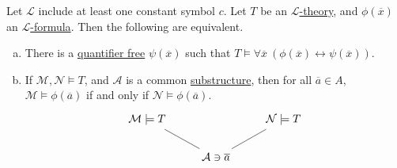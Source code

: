 \begin{theorem}\label{thm:QE-test}
	Let \(\mathcal{L} \) include at least one constant symbol \(c\). Let \(T\) be an \hyperref[def:theory]{\(\mathcal{L} \)-theory}, and \(\phi (\overline{x} )\) an \hyperref[def:formula]{\(\mathcal{L} \)-formula}. Then the following are equivalent.
	\begin{enumerate}[(a)]
		\item\label{thm:QE-test-a} There is a \hyperref[not:quantifier-free]{quantifier free} \(\psi (\overline{x} )\) such that \(T \models \forall \overline{x} \ (\phi (\overline{x} ) \leftrightarrow \psi (\overline{x} ))\).
		\item\label{thm:QE-test-b} If \(\mathcal{M} , \mathcal{N} \models T\), and \(\mathcal{A} \) is a common \hyperref[def:substructure]{substructure}, then for all \(\overline{a} \in A\), \(\mathcal{M} \models \phi (\overline{a} )\) if and only if \(\mathcal{N} \models \phi (\overline{a} )\).
		\[\begin{tikzcd}
				{\mathcal{M} \models T} && {\mathcal{N} \models T} \\
				& {\mathcal{A}\ni \overline{a}}
				\arrow[no head, from=1-1, to=2-2]
				\arrow[no head, from=2-2, to=1-3]
			\end{tikzcd}\]
	\end{enumerate}
\end{theorem}
